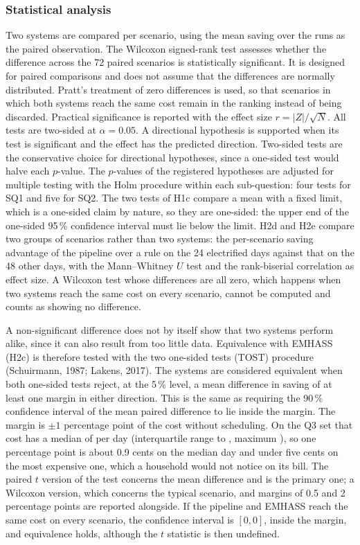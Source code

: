 \documentclass[12pt,a4paper]{report}
\begin{document}
\subsubsection*{Statistical analysis}

Two systems are compared per scenario, using the mean saving over the
runs as the paired observation. The Wilcoxon signed-rank test assesses
whether the difference across the 72 paired scenarios is statistically
significant. It is designed for paired comparisons and does not assume
that the differences are normally distributed. Pratt's treatment of zero differences is used, so that
scenarios in which both systems reach the same cost remain in the
ranking instead of being discarded. Practical significance is reported
with the effect size $r = |Z| / \sqrt{N}$. All tests are two-sided at
$\alpha = 0.05$. A directional hypothesis is supported when its test is
significant and the effect has the predicted direction. Two-sided tests
are the conservative choice for directional hypotheses, since a
one-sided test would halve each $p$-value. The $p$-values of the
registered hypotheses are adjusted for multiple testing with the Holm
procedure within each sub-question: four tests for SQ1 and five for
SQ2. The two tests of H1c compare a mean with a fixed limit, which is a
one-sided claim by nature, so they are one-sided: the upper end of the
one-sided 95\,\% confidence interval must lie below the limit. H2d and
H2e compare two groups of scenarios rather than two systems: the
per-scenario saving advantage of the pipeline over a rule on the 24
electrified days against that on the 48 other days, with the
Mann--Whitney $U$ test and the rank-biserial correlation as effect size.
A Wilcoxon test whose differences are all zero, which happens when two
systems reach the same cost on every scenario, cannot be computed and
counts as showing no difference.

A non-significant difference does not by itself show that two systems
perform alike, since it can also result from too little data.
Equivalence with EMHASS (H2c) is therefore tested with the two one-sided
tests (TOST) procedure (Schuirmann, 1987; Lakens, 2017). The systems are
considered equivalent when both one-sided tests reject, at the 5\,\%
level, a mean difference in saving of at least one margin in either
direction. This is the same as requiring the 90\,\% confidence interval
of the mean paired difference to lie inside the margin. The margin is
$\pm 1$ percentage point of the cost without scheduling. On the Q3 set
that cost has a median of  per day (interquartile range
 to , maximum ), so one percentage point
is about 0.9 cents on the median day and under five cents on the most
expensive one, which a household would not notice on its bill. The
paired $t$ version of the test concerns the mean difference and is the
primary one; a Wilcoxon version, which concerns the typical scenario, and
margins of 0.5 and 2 percentage points are reported alongside. If the
pipeline and EMHASS reach the same cost on every scenario, the
confidence interval is $[0, 0]$, inside the margin, and equivalence
holds, although the $t$ statistic is then undefined.
\end{document}
